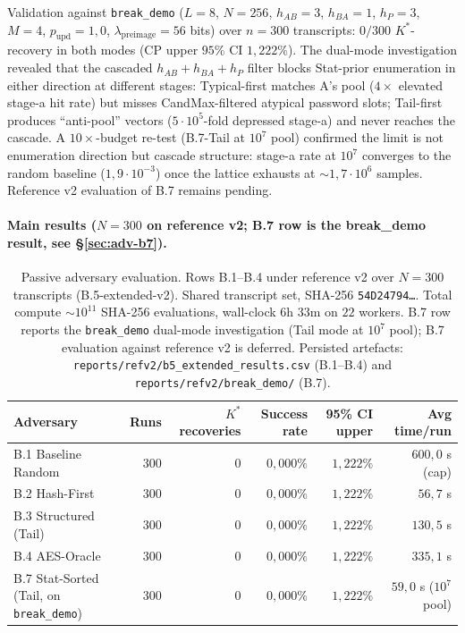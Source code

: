 \documentclass[11pt,a4paper]{article}
\begin{document}
Validation against \texttt{break\_demo} ($L=8$, $N=256$, $h_{AB}=3$, $h_{BA}=1$, $h_P=3$, $M=4$, $p_\text{upd}=1{,}0$, $\lambda_\text{preimage} = 56$ bits) over $n = 300$ transcripts: $0/300$ $K^*$-recovery in both modes (CP upper $95\%$ CI $1{,}222\%$). The dual-mode investigation revealed that the cascaded $h_{AB}+h_{BA}+h_P$ filter blocks Stat-prior enumeration in either direction at different stages: Typical-first matches A's pool ($4\times$ elevated stage-a hit rate) but misses CandMax-filtered atypical password slots; Tail-first produces ``anti-pool'' vectors ($5 \cdot 10^5$-fold depressed stage-a) and never reaches the cascade. A $10\times$-budget re-test (B.7-Tail at $10^7$ pool) confirmed the limit is not enumeration direction but cascade structure: stage-a rate at $10^7$ converges to the random baseline ($1{,}9 \cdot 10^{-3}$) once the lattice exhausts at $\sim 1{,}7 \cdot 10^6$ samples. Reference v2 evaluation of B.7 remains pending.

\paragraph{Main results ($N = 300$ on reference v2; B.7 row is the break_demo result, see §\ref{sec:adv-b7}).}

\begin{table}[ht]
\centering
\small
\begin{tabular}{lrrrrr}
\toprule
Adversary & Runs & $K^*$ recoveries & Success rate & 95\% CI upper & Avg time/run \\
\midrule
B.1 Baseline Random & 300 & 0 & $0{,}000\%$ & $1{,}222\%$ & $600{,}0$ s (cap) \\
B.2 Hash-First & 300 & 0 & $0{,}000\%$ & $1{,}222\%$ & $56{,}7$ s \\
B.3 Structured (Tail) & 300 & 0 & $0{,}000\%$ & $1{,}222\%$ & $130{,}5$ s \\
B.4 AES-Oracle & 300 & 0 & $0{,}000\%$ & $1{,}222\%$ & $335{,}1$ s \\
B.7 Stat-Sorted (Tail, on \texttt{break\_demo}) & 300 & 0 & $0{,}000\%$ & $1{,}222\%$ & $59{,}0$ s ($10^7$ pool) \\
\bottomrule
\end{tabular}
\caption{Passive adversary evaluation. Rows B.1--B.4 under reference v2 over $N = 300$ transcripts (B.5-extended-v2). Shared transcript set, SHA-256 \texttt{54D24794\ldots}. Total compute $\sim 10^{11}$ SHA-256 evaluations, wall-clock $6$h $33$m on $22$ workers. B.7 row reports the \texttt{break\_demo} dual-mode investigation (Tail mode at $10^7$ pool); B.7 evaluation against reference v2 is deferred. Persisted artefacts: \texttt{reports/refv2/b5\_extended\_results.csv} (B.1--B.4) and \texttt{reports/refv2/break\_demo/} (B.7).}
\label{tab:attackers}
\end{table}
\end{document}
